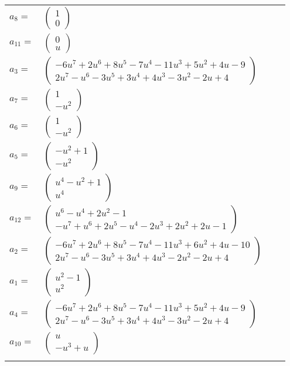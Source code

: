 \documentclass[1p]{elsarticle_modified}
\theoremstyle{definition}
\begin{document}
\begin{tabular}{m{7pt} m{180pt} m{7pt} m{180pt} }
\flushright $a_{8}=$&$\begin{pmatrix}1\\0\end{pmatrix}$ \\
\flushright $a_{11}=$&$\begin{pmatrix}0\\u\end{pmatrix}$ \\
\flushright $a_{3}=$&$\begin{pmatrix}-6 u^7+2 u^6+8 u^5-7 u^4-11 u^3+5 u^2+4 u-9\\2 u^7- u^6-3 u^5+3 u^4+4 u^3-3 u^2-2 u+4\end{pmatrix}$ \\
\flushright $a_{7}=$&$\begin{pmatrix}1\\- u^2\end{pmatrix}$ \\
\flushright $a_{6}=$&$\begin{pmatrix}1\\- u^2\end{pmatrix}$ \\
\flushright $a_{5}=$&$\begin{pmatrix}- u^2+1\\- u^2\end{pmatrix}$ \\
\flushright $a_{9}=$&$\begin{pmatrix}u^4- u^2+1\\u^4\end{pmatrix}$ \\
\flushright $a_{12}=$&$\begin{pmatrix}u^6- u^4+2 u^2-1\\- u^7+u^6+2 u^5- u^4-2 u^3+2 u^2+2 u-1\end{pmatrix}$ \\
\flushright $a_{2}=$&$\begin{pmatrix}-6 u^7+2 u^6+8 u^5-7 u^4-11 u^3+6 u^2+4 u-10\\2 u^7- u^6-3 u^5+3 u^4+4 u^3-2 u^2-2 u+4\end{pmatrix}$ \\
\flushright $a_{1}=$&$\begin{pmatrix}u^2-1\\u^2\end{pmatrix}$ \\
\flushright $a_{4}=$&$\begin{pmatrix}-6 u^7+2 u^6+8 u^5-7 u^4-11 u^3+5 u^2+4 u-9\\2 u^7- u^6-3 u^5+3 u^4+4 u^3-3 u^2-2 u+4\end{pmatrix}$ \\
\flushright $a_{10}=$&$\begin{pmatrix}u\\- u^3+u\end{pmatrix}$\\&\end{tabular}
\end{document}
